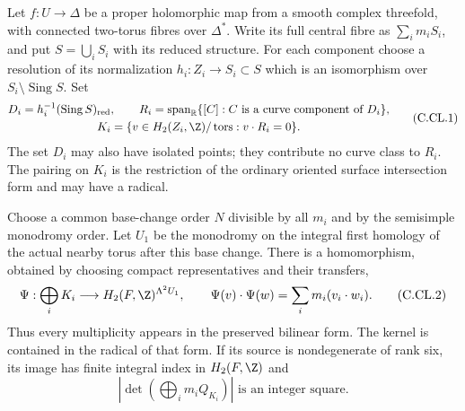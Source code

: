\begin{proposition}\label{cdp:st:C.2.UN.36}

Let $f:U\to\Delta$ be a proper holomorphic map from
a smooth complex threefold, with connected two-torus
fibres over $\Delta^*$. Write its full central fibre
as $\sum_i m_iS_i$, and put $S=\bigcup_iS_i$ with
its reduced structure. For each component choose a
resolution of its normalization
$h_i:Z_i\to S_i\subset S$ which is an isomorphism
over $S_i\setminus\operatorname{Sing}S$. Set
\[
 \begin{gathered}
 D_i=h_i^{-1}(\operatorname{Sing}S)_{\rm red},\qquad
 R_i=\operatorname{span}_{\mathbb R}
       \{[C]:C\text{ is a curve component of }D_i\},
 \\
 K_i=\{v\in H_2(Z_i,\Z)/\operatorname{tors}:v\cdot R_i=0\}.
 \end{gathered}
                                                               \tag{C.CL.1}\label{cdp:eq:C.CL.1}
\]
The set $D_i$ may also have isolated points; they
contribute no curve class to $R_i$. The pairing on
$K_i$ is the restriction of the ordinary oriented
surface intersection form and may have a radical.

Choose a common base-change order $N$ divisible by
all $m_i$ and by the semisimple monodromy order.
Let $U_1$ be the monodromy on the integral first
homology of the actual nearby torus after this
base change. There is a homomorphism, obtained by
choosing compact representatives and their transfers,
\[
 \Psi:\bigoplus_iK_i\longrightarrow
       H_2(F,\Z)^{\Lambda^2U_1},\qquad
 \Psi(v)\cdot\Psi(w)=\sum_i m_i(v_i\cdot w_i).
                                                               \tag{C.CL.2}\label{cdp:eq:C.CL.2}
\]
Thus every multiplicity appears in the preserved
bilinear form. The kernel is contained in the
radical of that form. If its source is nondegenerate
of rank six, its image has finite integral index
in $H_2(F,\Z)$ and
\[
 \left|\det\left(\bigoplus_i m_iQ_{K_i}\right)\right|
                       \text{ is an integer square}.
                                                               \tag{C.CL.3}\label{cdp:eq:C.CL.3}
\]


\end{proposition}
